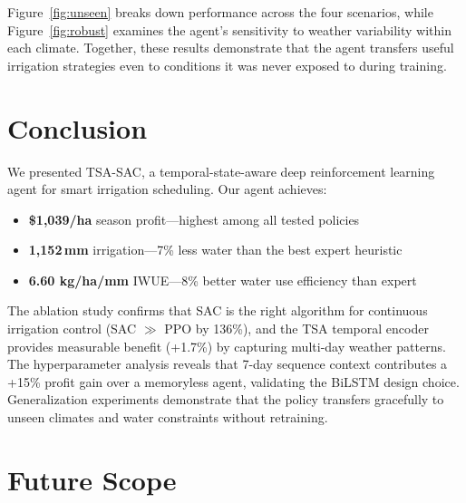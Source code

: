 \documentclass[12pt, a4paper]{article}
\begin{document}
Figure~\ref{fig:unseen} breaks down performance across the four scenarios, while Figure~\ref{fig:robust} examines the agent's sensitivity to weather variability within each climate. Together, these results demonstrate that the agent transfers useful irrigation strategies even to conditions it was never exposed to during training.

\section{Conclusion}

We presented TSA-SAC, a temporal-state-aware deep reinforcement learning agent for smart irrigation scheduling. Our agent achieves:
\begin{itemize}
    \item \textbf{\$1,039/ha} season profit---highest among all tested policies
    \item \textbf{1,152\,mm} irrigation---7\% less water than the best expert heuristic
    \item \textbf{6.60 kg/ha/mm} IWUE---8\% better water use efficiency than expert
\end{itemize}

The ablation study confirms that SAC is the right algorithm for continuous irrigation control (SAC $\gg$ PPO by 136\%), and the TSA temporal encoder provides measurable benefit (+1.7\%) by capturing multi-day weather patterns. The hyperparameter analysis reveals that 7-day sequence context contributes a +15\% profit gain over a memoryless agent, validating the BiLSTM design choice. Generalization experiments demonstrate that the policy transfers gracefully to unseen climates and water constraints without retraining.

\section{Future Scope}
\end{document}

